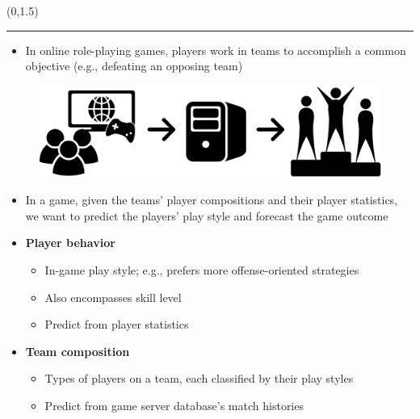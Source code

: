 \documentclass[a0]{a0poster}
\def\Head#1{\noindent{\LARGE\color{bluegray} #1}\bigskip}
\begin{document}
\begin{textblock}{7.0}(0,1.5)

\hrule\medskip
\Head{Introduction}

\begin{itemize}
  
  \item In online role-playing games, players work in teams to accomplish a common objective (e.g., defeating an opposing team)

\end{itemize}

\begin{figure}[!h]
  \centering
  \includegraphics[width=\textwidth]{intro-fig.pdf}
  \label{fig:intro}
\end{figure}

\vspace{-1em}

\begin{itemize}

  \item In a game, given the teams' player compositions and their player statistics, we want to predict the players' play style and forecast the game outcome

\end{itemize}

\begin{multicols}{2}
  
  \begin{itemize}
    \item \textbf{Player behavior}
    \begin{itemize}
      \item In-game play style; e.g., prefers more offense-oriented strategies
      \item Also encompasses skill level
      \item Predict from player statistics
    \end{itemize}

    \item \textbf{Team composition}
    \begin{itemize}
      \item Types of players on a team, each classified by their play styles
      \item Predict from game server database's match histories
    \end{itemize}
  \end{itemize}


\end{multicols}
\end{textblock}
\end{document}
